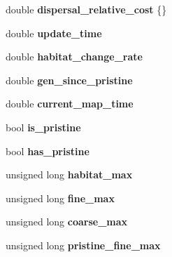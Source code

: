 \begin{DoxyCompactItemize}
\item 
double {\bfseries dispersal\+\_\+relative\+\_\+cost} \{\}\hypertarget{class_map_aeb8e8114c1bfa253379098978b50f603}{}\label{class_map_aeb8e8114c1bfa253379098978b50f603}

\item 
double {\bfseries update\+\_\+time}\hypertarget{class_map_aa61ad7fb290102bc5aa085b2b2a0db9e}{}\label{class_map_aa61ad7fb290102bc5aa085b2b2a0db9e}

\item 
double {\bfseries habitat\+\_\+change\+\_\+rate}\hypertarget{class_map_a7b408911660e9bdea9bd600f0149808d}{}\label{class_map_a7b408911660e9bdea9bd600f0149808d}

\item 
double {\bfseries gen\+\_\+since\+\_\+pristine}\hypertarget{class_map_aecea7aa734ff27cd11d362f3d6cf1f5b}{}\label{class_map_aecea7aa734ff27cd11d362f3d6cf1f5b}

\item 
double {\bfseries current\+\_\+map\+\_\+time}\hypertarget{class_map_a398f4c492eaceb4478745fb80f622d2b}{}\label{class_map_a398f4c492eaceb4478745fb80f622d2b}

\item 
bool {\bfseries is\+\_\+pristine}\hypertarget{class_map_a2310b482b9986a6a8e04e99c1b622bed}{}\label{class_map_a2310b482b9986a6a8e04e99c1b622bed}

\item 
bool {\bfseries has\+\_\+pristine}\hypertarget{class_map_a121203a1e2f05d718dbefcc086d3d7c0}{}\label{class_map_a121203a1e2f05d718dbefcc086d3d7c0}

\item 
unsigned long {\bfseries habitat\+\_\+max}\hypertarget{class_map_a023ee2f1943e4951c90b6432c4727b6e}{}\label{class_map_a023ee2f1943e4951c90b6432c4727b6e}

\item 
unsigned long {\bfseries fine\+\_\+max}\hypertarget{class_map_a22c982a0ab401a604f1b3f70084236aa}{}\label{class_map_a22c982a0ab401a604f1b3f70084236aa}

\item 
unsigned long {\bfseries coarse\+\_\+max}\hypertarget{class_map_a63bc1bd83bf9d720c1e73ac8d05f2ea0}{}\label{class_map_a63bc1bd83bf9d720c1e73ac8d05f2ea0}

\item 
unsigned long {\bfseries pristine\+\_\+fine\+\_\+max}\hypertarget{class_map_a53f737ddc03cf354a0e4d4fb676b2073}{}\label{class_map_a53f737ddc03cf354a0e4d4fb676b2073}


\end{DoxyCompactItemize}
